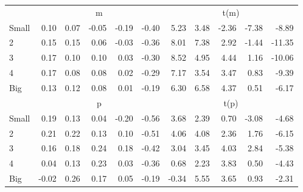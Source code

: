 \begin{table}[!ht]
\begin{tabular}{lrrrrrrrrrr}
  
    
      & \multicolumn{5}{c}{m} & \multicolumn{5}{c}{t(m)}
    
    \\
      \cmidrule(r){2-6} \cmidrule(r){7-11}

    Small   & 0.10  & 0.07  & -0.05  & -0.19  & -0.40  & 5.23  & 3.48  & -2.36  & -7.38  & -8.89  \\
         2  & 0.15  & 0.15  & 0.06  & -0.03  & -0.36  & 8.01  & 7.38  & 2.92  & -1.44  & -11.35  \\
         3  & 0.17  & 0.10  & 0.10  & 0.03  & -0.30  & 8.52  & 4.95  & 4.44  & 1.16  & -10.06  \\
         4  & 0.17  & 0.08  & 0.08  & 0.02  & -0.29  & 7.17  & 3.54  & 3.47  & 0.83  & -9.39  \\
    Big     & 0.13  & 0.12  & 0.08  & 0.01  & -0.19  & 6.30  & 6.58  & 4.37  & 0.51  & -6.17  \\

  
    
      & \multicolumn{5}{c}{p} & \multicolumn{5}{c}{t(p)}
    
    \\
      \cmidrule(r){2-6} \cmidrule(r){7-11}

    Small   & 0.19  & 0.13  & 0.04  & -0.20  & -0.56  & 3.68  & 2.39  & 0.70  & -3.08  & -4.68  \\
         2  & 0.21  & 0.22  & 0.13  & 0.10  & -0.51  & 4.06  & 4.08  & 2.36  & 1.76  & -6.15  \\
         3  & 0.16  & 0.18  & 0.24  & 0.18  & -0.42  & 3.04  & 3.45  & 4.03  & 2.84  & -5.38  \\
         4  & 0.04  & 0.13  & 0.23  & 0.03  & -0.36  & 0.68  & 2.23  & 3.83  & 0.50  & -4.43  \\
    Big     & -0.02  & 0.26  & 0.17  & 0.05  & -0.19  & -0.34  & 5.55  & 3.65  & 0.93  & -2.31  \\

  

  \bottomrule
\end{tabular}
\label{tbl:25_Size_Var_B16}
\end{table}